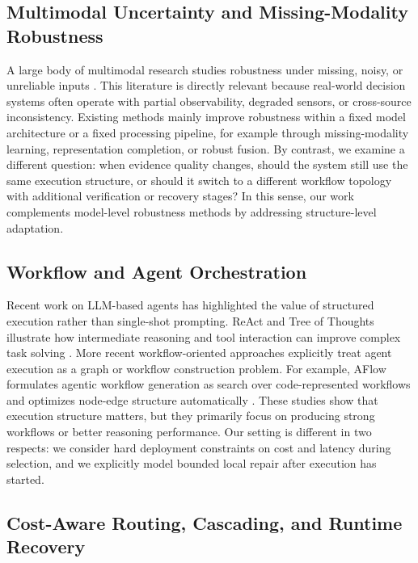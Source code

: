 \documentclass[acmsmall,review,anonymous]{acmart}
\begin{document}
\subsection{Multimodal Uncertainty and Missing-Modality Robustness}

A large body of multimodal research studies robustness under missing, noisy, or unreliable inputs \cite{lan2025robust,wu2024mlmmsurvey}. This literature is directly relevant because real-world decision systems often operate with partial observability, degraded sensors, or cross-source inconsistency. Existing methods mainly improve robustness within a fixed model architecture or a fixed processing pipeline, for example through missing-modality learning, representation completion, or robust fusion. By contrast, we examine a different question: when evidence quality changes, should the system still use the same execution structure, or should it switch to a different workflow topology with additional verification or recovery stages? In this sense, our work complements model-level robustness methods by addressing structure-level adaptation.

\subsection{Workflow and Agent Orchestration}

Recent work on LLM-based agents has highlighted the value of structured execution rather than single-shot prompting. ReAct and Tree of Thoughts illustrate how intermediate reasoning and tool interaction can improve complex task solving \cite{yao2023react,yao2023tot}. More recent workflow-oriented approaches explicitly treat agent execution as a graph or workflow construction problem. For example, AFlow formulates agentic workflow generation as search over code-represented workflows and optimizes node-edge structure automatically \cite{zhang2024aflow}. These studies show that execution structure matters, but they primarily focus on producing strong workflows or better reasoning performance. Our setting is different in two respects: we consider hard deployment constraints on cost and latency during selection, and we explicitly model bounded local repair after execution has started.

\subsection{Cost-Aware Routing, Cascading, and Runtime Recovery}
\end{document}
